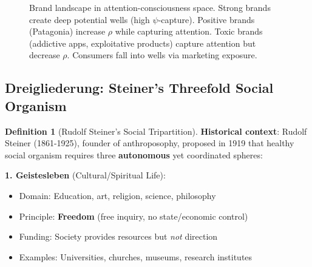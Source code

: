 \documentclass[11pt,a4paper]{article}
\theoremstyle{definition}
\newtheorem{definition}{Definition}[section]
\theoremstyle{remark}
\begin{document}
\begin{small}
\begin{enumerate}
\begin{figure}[H]
\caption{Brand landscape in attention-consciousness space. Strong brands create deep potential wells (high \(\psi\)-capture). Positive brands (Patagonia) increase \(\rho\) while capturing attention. Toxic brands (addictive apps, exploitative products) capture attention but decrease \(\rho\). Consumers fall into wells via marketing exposure.}
\label{fig:brand_attractors}
\end{figure}

\subsection{Dreigliederung: Steiner's Threefold Social Organism}

\begin{definition}[Rudolf Steiner's Social Tripartition]
\textbf{Historical context}: Rudolf Steiner (1861-1925), founder of anthroposophy, proposed in 1919 that healthy social organism requires three \textbf{autonomous} yet coordinated spheres:

\textbf{1. Geistesleben} (Cultural/Spiritual Life):
\begin{itemize}
    \item Domain: Education, art, religion, science, philosophy
    \item Principle: \textbf{Freedom} (free inquiry, no state/economic control)
    \item Funding: Society provides resources but \textit{not} direction
    \item Examples: Universities, churches, museums, research institutes
\end{itemize}


\end{definition}
\end{enumerate}
\end{small}
\end{document}
